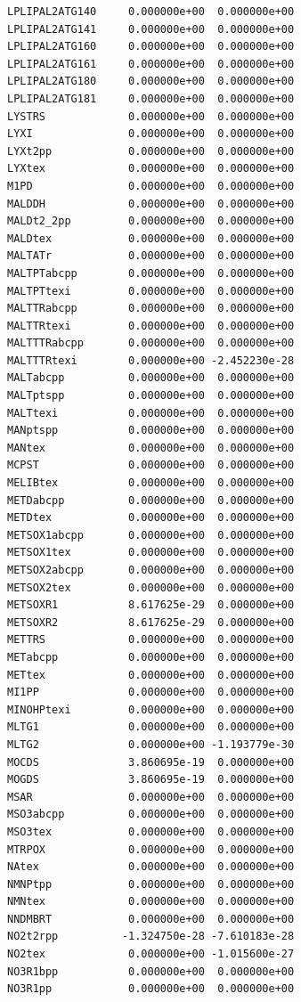 \documentclass{scrartcl}
\begin{document}
\begin{enumerate}
\begin{lstlisting}
LPLIPAL2ATG140     0.000000e+00  0.000000e+00
LPLIPAL2ATG141     0.000000e+00  0.000000e+00
LPLIPAL2ATG160     0.000000e+00  0.000000e+00
LPLIPAL2ATG161     0.000000e+00  0.000000e+00
LPLIPAL2ATG180     0.000000e+00  0.000000e+00
LPLIPAL2ATG181     0.000000e+00  0.000000e+00
LYSTRS             0.000000e+00  0.000000e+00
LYXI               0.000000e+00  0.000000e+00
LYXt2pp            0.000000e+00  0.000000e+00
LYXtex             0.000000e+00  0.000000e+00
M1PD               0.000000e+00  0.000000e+00
MALDDH             0.000000e+00  0.000000e+00
MALDt2_2pp         0.000000e+00  0.000000e+00
MALDtex            0.000000e+00  0.000000e+00
MALTATr            0.000000e+00  0.000000e+00
MALTPTabcpp        0.000000e+00  0.000000e+00
MALTPTtexi         0.000000e+00  0.000000e+00
MALTTRabcpp        0.000000e+00  0.000000e+00
MALTTRtexi         0.000000e+00  0.000000e+00
MALTTTRabcpp       0.000000e+00  0.000000e+00
MALTTTRtexi        0.000000e+00 -2.452230e-28
MALTabcpp          0.000000e+00  0.000000e+00
MALTptspp          0.000000e+00  0.000000e+00
MALTtexi           0.000000e+00  0.000000e+00
MANptspp           0.000000e+00  0.000000e+00
MANtex             0.000000e+00  0.000000e+00
MCPST              0.000000e+00  0.000000e+00
MELIBtex           0.000000e+00  0.000000e+00
METDabcpp          0.000000e+00  0.000000e+00
METDtex            0.000000e+00  0.000000e+00
METSOX1abcpp       0.000000e+00  0.000000e+00
METSOX1tex         0.000000e+00  0.000000e+00
METSOX2abcpp       0.000000e+00  0.000000e+00
METSOX2tex         0.000000e+00  0.000000e+00
METSOXR1           8.617625e-29  0.000000e+00
METSOXR2           8.617625e-29  0.000000e+00
METTRS             0.000000e+00  0.000000e+00
METabcpp           0.000000e+00  0.000000e+00
METtex             0.000000e+00  0.000000e+00
MI1PP              0.000000e+00  0.000000e+00
MINOHPtexi         0.000000e+00  0.000000e+00
MLTG1              0.000000e+00  0.000000e+00
MLTG2              0.000000e+00 -1.193779e-30
MOCDS              3.860695e-19  0.000000e+00
MOGDS              3.860695e-19  0.000000e+00
MSAR               0.000000e+00  0.000000e+00
MSO3abcpp          0.000000e+00  0.000000e+00
MSO3tex            0.000000e+00  0.000000e+00
MTRPOX             0.000000e+00  0.000000e+00
NAtex              0.000000e+00  0.000000e+00
NMNPtpp            0.000000e+00  0.000000e+00
NMNtex             0.000000e+00  0.000000e+00
NNDMBRT            0.000000e+00  0.000000e+00
NO2t2rpp          -1.324750e-28 -7.610183e-28
NO2tex             0.000000e+00 -1.015600e-27
NO3R1bpp           0.000000e+00  0.000000e+00
NO3R1pp            0.000000e+00  0.000000e+00

\end{lstlisting}
\end{enumerate}
\end{document}

